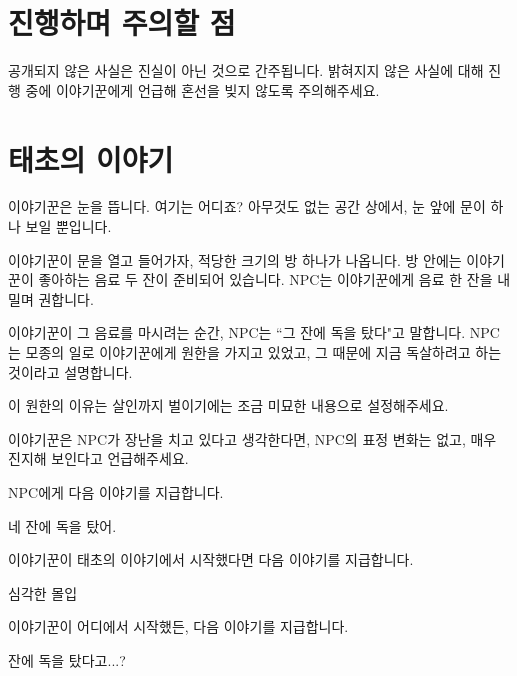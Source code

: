 \documentclass{report}
\begin{document}
	\section{진행하며 주의할 점}
	공개되지 않은 사실은 진실이 아닌 것으로 간주됩니다. 밝혀지지 않은 사실에 대해 진행 중에 이야기꾼에게 언급해 혼선을 빚지 않도록 주의해주세요.
	
	\section{태초의 이야기}
	이야기꾼은 눈을 뜹니다. 여기는 어디죠? 아무것도 없는 공간 상에서, 눈 앞에 문이 하나 보일 뿐입니다.
	
	이야기꾼이 문을 열고 들어가자, 적당한 크기의 방 하나가 나옵니다. 방 안에는 이야기꾼이 좋아하는 음료 두 잔이 준비되어 있습니다. NPC는 이야기꾼에게 음료 한 잔을 내밀며 권합니다.
	
	이야기꾼이 그 음료를 마시려는 순간, NPC는 ``그 잔에 독을 탔다"고 말합니다. NPC는 모종의 일로 이야기꾼에게 원한을 가지고 있었고, 그 때문에 지금 독살하려고 하는 것이라고 설명합니다.
	
	이 원한의 이유는 살인까지 벌이기에는 조금 미묘한 내용으로 설정해주세요.
	
	이야기꾼은 NPC가 장난을 치고 있다고 생각한다면, NPC의 표정 변화는 없고, 매우 진지해 보인다고 언급해주세요.
	
	NPC에게 다음 이야기를 지급합니다.
	
	\begin{lite}{네 잔에 독을 탔어.}
	\end{lite}
	
	이야기꾼이 태초의 이야기에서 시작했다면 다음 이야기를 지급합니다.
	
	\begin{lite}{심각한 몰입}
		
	\end{lite}
	
	이야기꾼이 어디에서 시작했든, 다음 이야기를 지급합니다.
	
	\begin{lite}{잔에 독을 탔다고...?}
	\end{lite}
	
\end{document}
